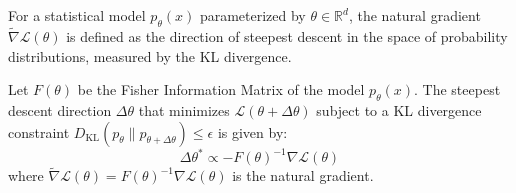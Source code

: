 \begin{definition}
For a statistical model $p_\theta(x)$ parameterized by $\theta \in \mathbb{R}^d$, the natural gradient $\tilde{\nabla} \mathcal{L}(\theta)$ is defined as the direction of steepest descent in the space of probability distributions, measured by the KL divergence.
\end{definition}

\begin{theorem}
Let $F(\theta)$ be the Fisher Information Matrix of the model $p_\theta(x)$. The steepest descent direction $\Delta \theta$ that minimizes $\mathcal{L}(\theta + \Delta \theta)$ subject to a KL divergence constraint $D_{\mathrm{KL}}(p_\theta \parallel p_{\theta+\Delta\theta}) \leq \epsilon$ is given by:
\begin{equation}
    \Delta \theta^* \propto -F(\theta)^{-1} \nabla \mathcal{L}(\theta)
\end{equation}
where $\tilde{\nabla} \mathcal{L}(\theta) = F(\theta)^{-1} \nabla \mathcal{L}(\theta)$ is the natural gradient.
\end{theorem}

